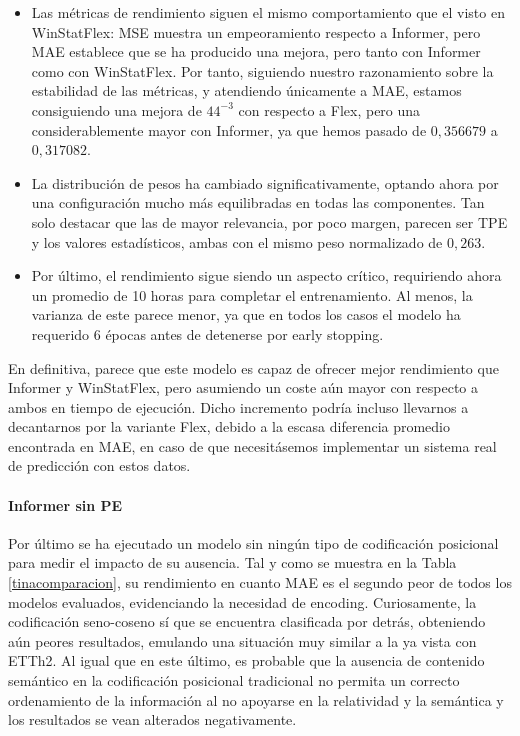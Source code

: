 \begin{itemize}
	\item Las métricas de rendimiento siguen el mismo comportamiento que el visto en WinStatFlex: MSE muestra un empeoramiento respecto a Informer, pero MAE establece que se ha producido una mejora, pero tanto con Informer como con WinStatFlex. Por tanto, siguiendo nuestro razonamiento sobre la estabilidad de las métricas, y atendiendo únicamente a MAE, estamos consiguiendo una mejora de $44^{-3}$ con respecto a Flex, pero una considerablemente mayor con Informer, ya que hemos pasado de $0,356679$ a $0,317082$.
	
	\item La distribución de pesos ha cambiado significativamente, optando ahora por una configuración mucho más equilibradas en todas las componentes. Tan solo destacar que las de mayor relevancia, por poco margen, parecen ser TPE y los valores estadísticos, ambas con el mismo peso normalizado de $0,263$.
	
	\item Por último, el rendimiento sigue siendo un aspecto crítico, requiriendo ahora un promedio de 10 horas para completar el entrenamiento. Al menos, la varianza de este parece menor, ya que en todos los casos el modelo ha requerido 6 épocas antes de detenerse por early stopping.
\end{itemize}


En definitiva, parece que este modelo es capaz de ofrecer mejor rendimiento que Informer y WinStatFlex, pero asumiendo un coste aún mayor con respecto a ambos en tiempo de ejecución. Dicho incremento podría incluso llevarnos a decantarnos por la variante Flex, debido a la escasa diferencia promedio encontrada en MAE, en caso de que necesitásemos implementar un sistema real de predicción con estos datos.

\paragraph{Informer sin PE}

Por último se ha ejecutado un modelo sin ningún tipo de codificación posicional para medir el impacto de su ausencia. Tal y como se muestra en la Tabla \ref{tinacomparacion}, su rendimiento en cuanto MAE es el segundo peor de todos los modelos evaluados, evidenciando la necesidad de encoding. Curiosamente, la codificación seno-coseno sí que se encuentra clasificada por detrás, obteniendo aún peores resultados, emulando una situación muy similar a la ya vista con ETTh2. Al igual que en este último, es probable que la ausencia de contenido semántico en la codificación posicional tradicional no permita un correcto ordenamiento de la información al no apoyarse en la relatividad y la semántica y los resultados se vean alterados negativamente.


